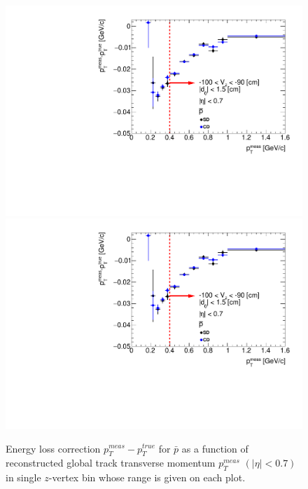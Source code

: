 \begin{figure}[H]
\caption[Energy loss correction for $\bar{p}$ as a function of reconstructed global track transverse momentum $p_T^{meas}$.]{Energy loss correction $p_T^{meas}-p_T^{true}$ for $\bar{p}$ as a function of reconstructed global track transverse momentum $p_T^{meas}$ $\left(|\eta|<0.7\right)$ in single $z$-vertex bin whose range is given on each plot.}\label{fig:energyLossPrimaryP_barGlobal}
\parbox{0.329\textwidth}{
  \includegraphics[width=\linewidth,page=3]{graphics/energyLoss/energyLoss3DGlobal_OnePrtAlso.pdf}\\
  \includegraphics[width=\linewidth,page=6]{graphics/energyLoss/energyLoss3DGlobal_OnePrtAlso.pdf}\\
}
\end{figure}
